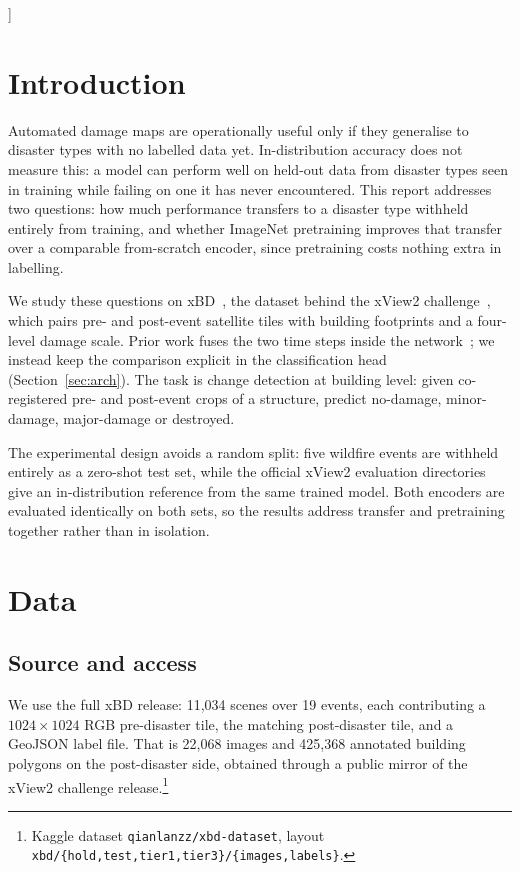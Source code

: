 \documentclass[10pt,twocolumn]{article}
\newcommand{\class}[1]{\textsf{#1}}
\begin{document}
]

\section{Introduction}

Automated damage maps are operationally useful only if they generalise to disaster types with no
labelled data yet. In-distribution accuracy does not measure this: a model can perform well on
held-out data from disaster types seen in training while failing on one it has never encountered.
This report addresses two questions: how much performance transfers to a disaster type withheld
entirely from training, and whether ImageNet pretraining improves that transfer over a comparable
from-scratch encoder, since pretraining costs nothing extra in labelling.

We study these questions on xBD~\cite{xbd}, the dataset behind the xView2 challenge~\cite{xview2},
which pairs pre- and post-event satellite tiles with building footprints and a four-level damage
scale. Prior work fuses the two time steps inside the network~\cite{fusion}; we instead keep the
comparison explicit in the classification head (Section~\ref{sec:arch}). The task is change detection
at building level: given co-registered pre- and post-event crops of a structure, predict
\class{no-damage}, \class{minor-damage}, \class{major-damage} or \class{destroyed}.

The experimental design avoids a random split: five wildfire events are withheld entirely as a
zero-shot test set, while the official xView2 evaluation directories give an in-distribution
reference from the same trained model. Both encoders are evaluated identically on both sets, so the
results address transfer and pretraining together rather than in isolation.

\section{Data}

\subsection{Source and access}

We use the full xBD release: 11,034 scenes over 19 events, each contributing a $1024\times1024$ RGB
pre-disaster tile, the matching post-disaster tile, and a GeoJSON label file. That is 22,068 images
and 425,368 annotated building polygons on the post-disaster side, obtained through a
public mirror of the xView2 challenge release.\footnote{Kaggle dataset
\texttt{qianlanzz/\allowbreak xbd-dataset}, layout
\texttt{xbd/\{hold,\allowbreak test,\allowbreak tier1,\allowbreak tier3\}/\allowbreak \{images,\allowbreak labels\}}.}
\end{document}
